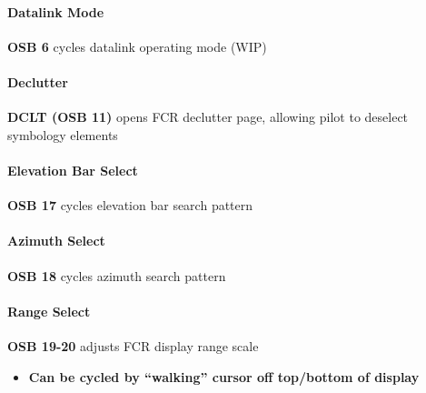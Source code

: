 \paragraph{Datalink Mode} 
\textbf{OSB 6} cycles datalink operating mode (WIP)

\paragraph{Declutter} 
\textbf{DCLT (OSB 11)} opens FCR declutter page,
allowing pilot to deselect symbology elements

\paragraph{Elevation Bar Select} 
\textbf{OSB 17} cycles elevation bar search pattern

\paragraph{Azimuth Select}
\textbf{OSB 18} cycles azimuth search pattern
\paragraph{Range Select}
\textbf{OSB 19-20} adjusts FCR display range scale

\begin{itemize}
    \item \textbf{Can be cycled by ``walking'' cursor off top/bottom of display}
\end{itemize}


